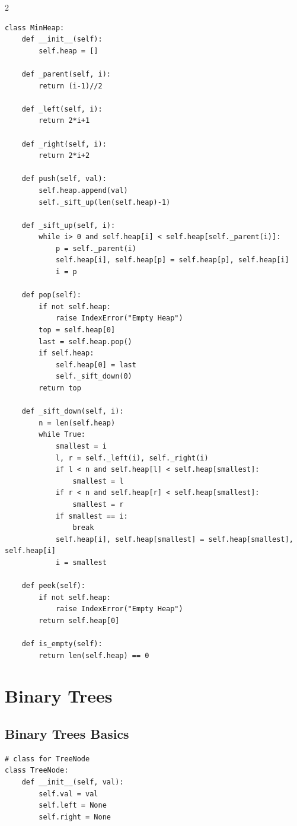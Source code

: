 \documentclass[9pt,a4paper]{extarticle}
\begin{document}
\begin{multicols}{2}
\begin{lstlisting}
class MinHeap:
    def __init__(self):
        self.heap = []

    def _parent(self, i):
        return (i-1)//2

    def _left(self, i):
        return 2*i+1

    def _right(self, i):
        return 2*i+2

    def push(self, val):
        self.heap.append(val)
        self._sift_up(len(self.heap)-1)

    def _sift_up(self, i):
        while i> 0 and self.heap[i] < self.heap[self._parent(i)]:
            p = self._parent(i)
            self.heap[i], self.heap[p] = self.heap[p], self.heap[i]
            i = p

    def pop(self):
        if not self.heap:
            raise IndexError("Empty Heap")
        top = self.heap[0]
        last = self.heap.pop()
        if self.heap:
            self.heap[0] = last
            self._sift_down(0)
        return top

    def _sift_down(self, i):
        n = len(self.heap)
        while True:
            smallest = i
            l, r = self._left(i), self._right(i)
            if l < n and self.heap[l] < self.heap[smallest]:
                smallest = l
            if r < n and self.heap[r] < self.heap[smallest]:
                smallest = r
            if smallest == i:
                break
            self.heap[i], self.heap[smallest] = self.heap[smallest], self.heap[i]
            i = smallest

    def peek(self):
        if not self.heap:
            raise IndexError("Empty Heap")
        return self.heap[0]

    def is_empty(self):
        return len(self.heap) == 0
\end{lstlisting}

\section{Binary Trees}

\subsection{Binary Trees Basics}

\begin{lstlisting}
# class for TreeNode
class TreeNode:
    def __init__(self, val):
        self.val = val
        self.left = None
        self.right = None


\end{lstlisting}
\end{multicols}
\end{document}
